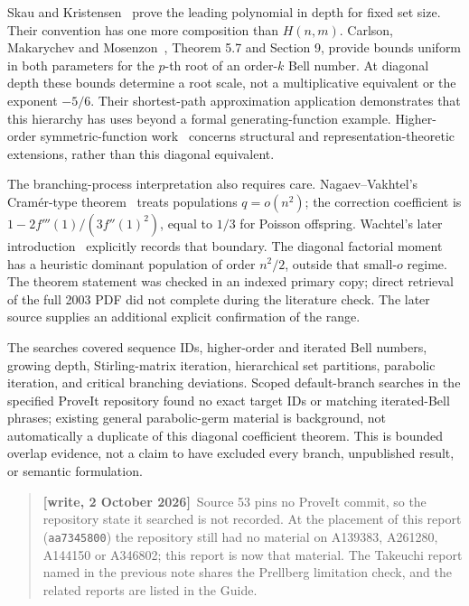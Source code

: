 \documentclass[11pt,letterpaper]{article}
\theoremstyle{remark}\newtheorem{remark}[theorem]{Remark}
\newenvironment{writenote}{\par\smallskip\begin{quote}\small\textbf{[write, 2 October 2026]}\ }{\end{quote}\smallskip}
\begin{document}
Skau and Kristensen~\cite{skau} prove the leading polynomial in depth for fixed set size. Their convention has one more composition than $H(n,m)$. Carlson, Makarychev and Mosenzon~\cite{cmm}, Theorem 5.7 and Section 9, provide bounds uniform in both parameters for the $p$-th root of an order-$k$ Bell number. At diagonal depth these bounds determine a root scale, not a multiplicative equivalent or the exponent $-5/6$. Their shortest-path approximation application demonstrates that this hierarchy has uses beyond a formal generating-function example. Higher-order symmetric-function work~\cite{weising} concerns structural and representation-theoretic extensions, rather than this diagonal equivalent.

The branching-process interpretation also requires care. Nagaev--Vakhtel's Cram\'er-type theorem~\cite{nv} treats populations $q=o(n^2)$; the correction coefficient is $1-2f'''(1)/(3f''(1)^2)$, equal to $1/3$ for Poisson offspring. Wachtel's later introduction~\cite{wachtel} explicitly records that boundary. The diagonal factorial moment has a heuristic dominant population of order $n^2/2$, outside that small-$o$ regime. The theorem statement was checked in an indexed primary copy; direct retrieval of the full 2003 PDF did not complete during the literature check. The later source supplies an additional explicit confirmation of the range.

The searches covered sequence IDs, higher-order and iterated Bell numbers, growing depth, Stirling-matrix iteration, hierarchical set partitions, parabolic iteration, and critical branching deviations. Scoped default-branch searches in the specified ProveIt repository found no exact target IDs or matching iterated-Bell phrases; existing general parabolic-germ material is background, not automatically a duplicate of this diagonal coefficient theorem. This is bounded overlap evidence, not a claim to have excluded every branch, unpublished result, or semantic formulation.
\begin{writenote}Source 53 pins no ProveIt commit, so the repository state it searched is not recorded. At the placement of this report (\texttt{aa7345800}) the repository still had no material on A139383, A261280, A144150 or A346802; this report is now that material. The Takeuchi report named in the previous note shares the Prellberg limitation check, and the related reports are listed in the Guide.\end{writenote}
\end{document}
